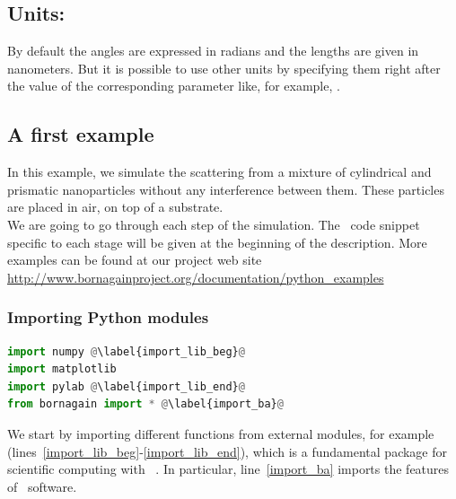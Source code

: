\subsection{Units:} 

By default the angles are expressed in radians and the lengths are given in
nanometers.  But it is possible to use other units by
specifying them right after the value of the corresponding
parameter like, for example, .


\subsection{A first example} 

In this example, we simulate the scattering from a mixture of
cylindrical and prismatic nanoparticles without any interference
between them. These particles are placed in air, on top
of a substrate.\\ We are going to go through each step of the
simulation. The \Python\ code snippet specific to each stage will be given at
the beginning of the description. 
More examples can be found at our project web site \url{http://www.bornagainproject.org/documentation/python_examples}


\subsubsection{Importing Python modules}

\begin{lstlisting}[language=python, style=eclipseboxed,name=ex1,nolol]
import numpy @\label{import_lib_beg}@
import matplotlib
import pylab @\label{import_lib_end}@
from bornagain import * @\label{import_ba}@
\end{lstlisting}
We start by importing different functions from external
modules, for example  (lines~\ref{import_lib_beg}-\ref{import_lib_end}), which
is a fundamental package for scientific computing with \Python\
\cite{s:numpy}.  In particular, line~\ref{import_ba}
imports the features of \BornAgain\ software.

